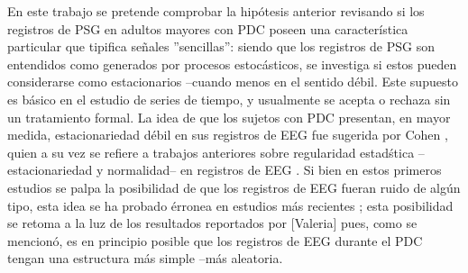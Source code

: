 \documentclass[12pt,a4paper]{mitthesis}
\begin{document}
En este trabajo se pretende comprobar la hip\'otesis anterior revisando si los registros de PSG en 
adultos mayores con PDC poseen una caracter\'istica particular que tipifica se\~nales 
''sencillas'': siendo que los registros de PSG son entendidos como generados por procesos 
estoc\'asticos, se investiga si estos pueden considerarse como estacionarios --cuando menos en el 
sentido d\'ebil.
Este supuesto es b\'asico en el estudio de series de tiempo, y usualmente se acepta o rechaza 
sin un tratamiento formal.
La idea de que los sujetos con PDC presentan, en mayor medida, estacionariedad d\'ebil en sus 
registros de EEG fue sugerida por Cohen \cite{Cohen77}, quien a su vez se refiere a trabajos 
anteriores sobre regularidad estad\'stica --estacionariedad y normalidad-- en registros de EEG \cite{McEwen75,Sugimoto78,Kawabata73}. 
Si bien en estos primeros estudios se palpa la posibilidad de que los registros de EEG fueran
ruido de alg\'un tipo, esta idea se ha probado \'erronea en estudios m\'as recientes 
\cite{Klonowski09}; esta posibilidad se retoma a la luz de los resultados reportados por
[Valeria] pues, como se mencion\'o, es en principio posible que los registros de EEG durante el 
PDC tengan una estructura m\'as simple --m\'as aleatoria.

\end{document}
